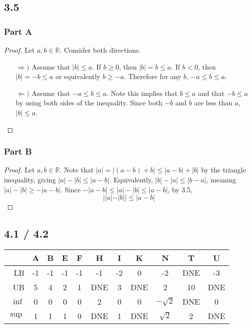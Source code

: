 \documentclass[12pt,titlepage]{extarticle}
\begin{document}
\subsection*{3.5}
\subsubsection*{Part A}
\begin{proof}
	Let $a,b \in \mathbb{R}$. Consider both directions.
	\begin{enumerate}
		\item[$\Rightarrow)$]
			Assume that $|b| \leq a$. If $b \geq 0$, then $|b| = b \leq a$. If $b < 0$, then $|b| = -b \leq a$ or equivalently $b \geq -a$. Therefore for any $b$, $-a \leq b \leq a$.
		\item[$\Leftarrow)$]
			Assume that $-a \leq b \leq a$. Note this implies that $b \leq a$ and that $-b \leq a$ by using both sides of the inequality. Since both $-b$ and $b$ are less than $a$, $|b| \leq a$.
	\end{enumerate}
\end{proof}

\subsubsection*{Part B}
\begin{proof}
	Let $a,b \in \mathbb{R}$. Note that $|a| = |(a-b) + b| \leq |a-b| + |b|$ by the triangle inequality, giving $|a| - |b| \leq |a-b|$. Equivalently, $|b| - |a| \leq |b - a|$, meaning $|a| - |b| \geq -|a-b|$. Since $-|a-b| \leq |a| - |b| \leq |a-b|$, by 3.5,
	\[
		||a| - |b|| \leq |a-b|
	\]
\end{proof}

\subsection*{4.1 / 4.2}

\begin{center}
	\def\arraystretch{1.5}
	\begin{tabular}{r|c|c|c|c|c|c|c|c|c|c}
			   & A  & B  & E  & F  & H   & I  & K   & N           & T   & U   \\\hline
		LB     & -1 & -1 & -1 & -1 & -1  & -2 & 0   & -2          & DNE & -3  \\\hline
		UB     & 5  & 4  & 2  & 1  & DNE & 3  & DNE & 2           & 10  & DNE \\\hline
		$\inf$ & 0  & 0  & 0  & 0  & 2   & 0  & 0   & $-\sqrt{2}$ & DNE & 0   \\\hline
		$\sup$ & 1  & 1  & 1  & 0  & DNE & 1  & DNE & $\sqrt{2}$  & 2   & DNE
	\end{tabular}
\end{center}
\end{document}
